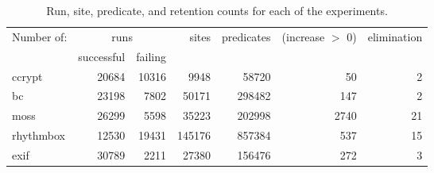 \documentclass{article}
\begin{document}
\begin{table*}
\begin{tabular}{|l|r|r|r|r|r|r|}
\hline
Number of: & \multicolumn{2}{c|}{runs} & sites  & predicates & (increase $>$ 0) & elimination \\
\cline{2-3}
           & successful & failing &  & & &  \\
\hline 
\hline 
ccrypt     & 20684 & 10316 & 9948   & 58720  & 50      & 2 \\
\hline 
bc         & 23198 & 7802  & 50171 & 298482 & 147 & 2 \\ 
\hline 
moss       & 26299 & 5598  & 35223  & 202998 & 2740    & 21 \\
\hline 
rhythmbox  & 12530 & 19431 & 145176 & 857384 & 537     & 15 \\
\hline 
exif       & 30789 & 2211  & 27380  & 156476 & 272     & 3 \\ 
\hline
\end{tabular}
\caption{Run, site, predicate, and retention counts for each of the experiments.}
\label{tab:exps}
\end{table*}
\end{document}
